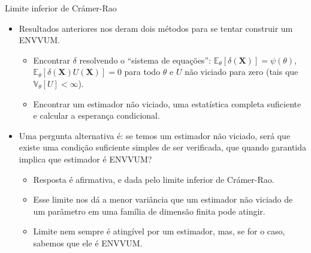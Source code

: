 \documentclass[11pt]{beamer}
\begin{document}
			\begin{frame}{Limite inferior de Crámer-Rao}
		\begin{itemize}
			\item Resultados anteriores nos deram dois métodos para se tentar construir um ENVVUM.
			\begin{itemize}
				\item Encontrar $\delta$ resolvendo o ``sistema de equações'': $\mathbb{E}_\theta[\delta(\boldsymbol{X})]=\psi(\theta)$, $\mathbb{E}_\theta[\delta(\boldsymbol{X}) U(\boldsymbol{X})] = 0$ para todo $\theta$ e $U$ não viciado para zero (tais que $\mathbb{V}_\theta[U]<\infty$).
				\item Encontrar um estimador não viciado, uma estatística completa suficiente e calcular a esperança condicional.
			\end{itemize}
			\item Uma pergunta alternativa é: se temos um estimador não viciado, será que existe uma condição {\color{blue}suficiente} simples de ser verificada, que quando garantida implica que estimador é ENVVUM?
			\begin{itemize}
				\item Resposta é afirmativa, e dada pelo limite inferior de Crámer-Rao.
				\item Esse limite nos dá a menor variância que um estimador não viciado de um parâmetro em uma família de dimensão finita pode atingir.
				\item Limite nem sempre é atingível por um estimador, mas, se for o caso, sabemos que ele é ENVVUM.
			\end{itemize}
		\end{itemize}
	\end{frame}
\end{document}

